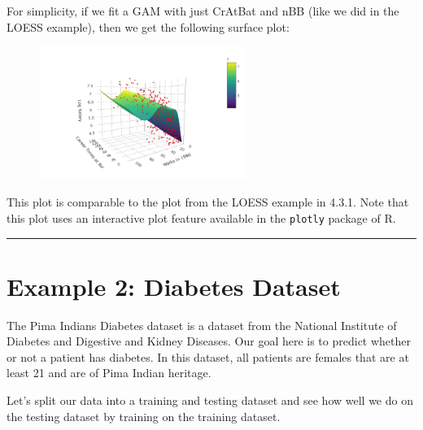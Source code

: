 \documentclass{article}\usepackage[]{graphicx}\usepackage[]{color}
\begin{document}
For simplicity, if we fit a GAM with just CrAtBat and nBB (like we did in the LOESS example), then we get the following surface plot:

\begin{figure}[H]
	\centering
	\includegraphics[width=0.6\textwidth]{gam_baseball_demo_mgcv.png}
	\label{fig:myfig}
\end{figure}

This plot is comparable to the plot from the LOESS example in 4.3.1. Note that this plot uses an interactive plot feature available in the \texttt{plotly} package of R. 

\bigskip
\hrule
\bigskip

\section*{Example 2: Diabetes Dataset}

The Pima Indians Diabetes dataset is a dataset from the National Institute of Diabetes and Digestive and Kidney Diseases. Our goal here is to predict whether or not a patient has diabetes. In this dataset, all patients are females that are at least 21 and are of Pima Indian heritage.

Let's split our data into a training and testing dataset and see how well we do on the testing dataset by training on the training dataset.
\end{document}
